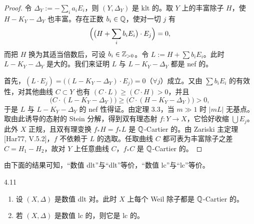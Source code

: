 \begin{proof}
令 $\Delta_Y:=-\sum_i a_iE_i$，则 $(Y,\Delta_Y)$ 是 klt 的。取 $Y$ 上的丰富除子 $H$，使 $H-K_Y-\Delta_Y$ 也丰富。存在正数 $b_i\in\mathbb{Q}$，使对一切 $j$ 有
\[
\Bigl(\bigl(H+\sum_i b_iE_i\bigr)\cdot E_j\Bigr)=0 ,
\]
而把 $H$ 换为其适当倍数后，可设 $b_i\in\mathbb{Z}_{>0}$。令 $L:=H+\sum b_iE_i$。此时 $L-K_Y-\Delta_Y$ 是大的。我们来证明 $L$ 与 $L-K_Y-\Delta_Y$ 都是 nef 的。

首先，$(L\cdot E_j)=\bigl((L-K_Y-\Delta_Y)\cdot E_j\bigr)=0$（$\forall j$）成立。又由 $\sum b_iE_i$ 的有效性，对其他曲线 $C\subset Y$ 也有 $(C\cdot L)\ge(C\cdot H)>0$，并且
\[
\bigl(C\cdot(L-K_Y-\Delta_Y)\bigr)\ge\bigl(C\cdot(H-K_Y-\Delta_Y)\bigr)>0 ,
\]
于是 $L$ 与 $L-K_Y-\Delta_Y$ 的 nef 性得证。由定理 3.3，当 $m\gg 1$ 时 $|mL|$ 无基点。取由此诱导的态射的 Stein 分解，得到双有理态射 $f\colon Y\to X$，它恰好收缩 $\bigcup E_j$。此外 $X$ 正规，且双有理变换 $f_*H=f_*L$ 是 $\mathbb{Q}$-Cartier 的。由 Zariski 主定理 [Har77, V.5.2]，$f$ 不依赖于 $L$ 的选取。任取曲线 $C$ 都可表为丰富除子之差 $C=H_1-H_2$，故对 $Y$ 上任意曲线 $C$，$f_*C$ 是 $\mathbb{Q}$-Cartier 的。
\end{proof}

由下面的结果可知，“数值 dlt”与“dlt”等价，“数值 lc”与“lc”等价。

\begin{propositionp}{4.11}
\begin{enumerate}[label=(\arabic*),leftmargin=*]
\item 设 $(X,\Delta)$ 是数值 dlt 对。此时 $X$ 上每个 Weil 除子都是 $\mathbb{Q}$-Cartier 的。
\item 若 $(X,\Delta)$ 是数值 lc 的，则它是 lc 的。
\end{enumerate}
\end{propositionp}


